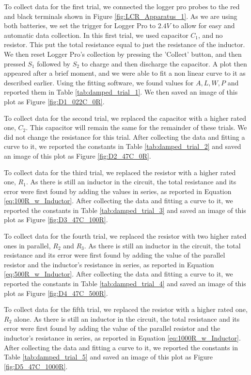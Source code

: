 \documentclass[12pt]{article}
\begin{document}
To collect data for the first trial, we connected the logger pro probes to the red and black terminals shown in Figure \ref{fig:LCR_Apparatus_1}. As we are using both batteries, we set the trigger for Logger Pro to $2.4V$ to allow for easy and automatic data collection. In this first trial, we used capacitor $C_1$, and no resistor. This put the total resistance equal to just the resistance of the inductor. We then reset Logger Pro's collection by pressing the 'Collect' button, and then pressed $S_1$ followed by $S_2$ to charge and then discharge the capacitor.  A plot then appeared after a brief moment, and we were able to fit a non linear curve to it as described earlier. Using the fitting software, we found values for $A, L, W, P$ and reported them in Table \ref{tab:damped_trial_1}. We then saved an image of this plot as Figure \ref{fig:D1_022C_0R}.

To collect data for the second trial, we replaced the capacitor with a higher rated one, $C_2$. This capacitor will remain the same for the remainder of these trials. We did not change the resistance for this trial. After collecting the data and fitting a curve to it, we reported the constants in Table \ref{tab:damped_trial_2} and saved an image of this plot as Figure \ref{fig:D2_47C_0R}.

To collect data for the third trial, we replaced the resistor with a higher rated one, $R_1$. As there is still an inductor in the circuit, the total resistance and its error were first found by adding the values in series, as reported in Equation \ref{eq:100R_w_Inductor}. After collecting the data and fitting a curve to it, we reported the constants in Table \ref{tab:damped_trial_3} and saved an image of this plot as Figure \ref{fig:D3_47C_100R}.

To collect data for the fourth trial, we replaced the resistor with two higher rated ones in parallel, $R_2$ and $R_3$. As there is still an inductor in the circuit, the total resistance and its error were first found by adding the value of the parallel resistor and the inductor's resistance in series, as reported in Equation \ref{eq:500R_w_Inductor}. After collecting the data and fitting a curve to it, we reported the constants in Table \ref{tab:damped_trial_4} and saved an image of this plot as Figure \ref{fig:D4_47C_500R}.

To collect data for the fifth trial, we replaced the resistor with a higher rated one, $R_2$ alone. As there is still an inductor in the circuit, the total resistance and its error were first found by adding the value of the parallel resistor and the inductor's resistance in series, as reported in Equation \ref{eq:1000R_w_Inductor}. After collecting the data and fitting a curve to it, we reported the constants in Table \ref{tab:damped_trial_5} and saved an image of this plot as Figure \ref{fig:D5_47C_1000R}.
\end{document}
